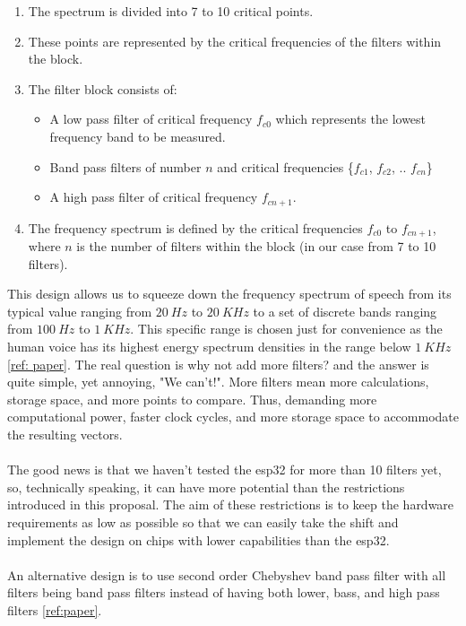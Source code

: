 \documentclass{article}
\begin{document}
	\begin{enumerate}
	    \item The spectrum is divided into 7 to 10 critical points.
	    
	    \item These points are represented by the critical frequencies of the filters within the block.
	    
	    \item The filter block consists of:
	        \begin{itemize}
	             \item A low pass filter of critical frequency $f_{c0}$ which represents the lowest frequency band to be measured.
	             
	             \item Band pass filters of number $n$ and critical frequencies \{$f_{c1}$, $f_{c2}$, .. $f_{cn}$\}
	             
	             \item A high pass filter of critical frequency $f_{cn+1}$.
	        \end{itemize}
	        
        \item The frequency spectrum is defined by the critical frequencies $f_{c0}$ to $f_{cn+1}$, where $n$ is the number of filters within the block (in our case from 7 to 10 filters).
	    
	\end{enumerate}
	This design allows us to squeeze down the frequency spectrum of speech from its typical value ranging from $20~Hz$ to $20~KHz$ to a set of discrete bands ranging from $100~Hz$ to $1~KHz$. This specific range is chosen just for convenience as the human voice has its highest energy spectrum densities in the range below $1~KHz$ \ref{ref: paper}. The real question is why not add more filters? and the answer is quite simple, yet annoying, "We can't!". More filters mean more calculations, storage space, and more points to compare. Thus, demanding more computational power, faster clock cycles, and more storage space to accommodate the resulting vectors. 	\\\\
	The good news is that we haven't tested the esp32 for more than 10 filters yet, so, technically speaking, it can have more potential than the restrictions introduced in this proposal. The aim of these restrictions is to keep the hardware requirements as low as possible so that we can easily take the shift and implement the design on chips with lower capabilities than the esp32. \\\\
	An alternative design is to use second order Chebyshev band pass filter with all filters being band pass filters instead of having both lower, bass, and high pass filters \ref{ref:paper}.
	
\end{document}
